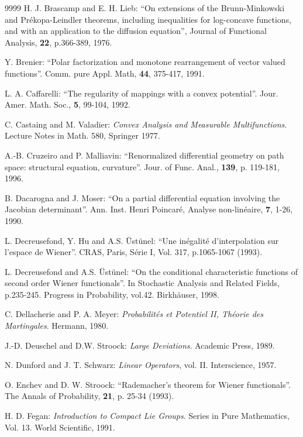 \documentclass[12pt,a4paper]{book}
\begin{document}
\begin{thebibliography}{9999}
H. J. Brascamp and E. H. Lieb:
``On extensions of the Brunn-Minkowski and Pr\'ekopa-Leindler theorems,
including inequalities for log-concave functions, and with an application to
the diffusion equation'', Journal of Functional Analysis, {\bf 22},
p.366-389, 1976.

Y. Brenier: 
``Polar factorization and monotone rearrangement of vector valued
functions''. Comm. pure Appl. Math, {\bf 44}, 375-417, 1991.

L. A. Caffarelli: ``The regularity of mappings with a convex
potential''. Jour. Amer. Math. Soc., {\bf 5}, 99-104, 1992.


C. Castaing and M. Valadier: {\sl Convex Analysis and
  Measurable Multifunctions}. Lecture Notes in Math. 580, Springer 1977.

 A.-B. Cruzeiro and P. Malliavin: ``Renormalized differential
  geometry on path space: structural equation, curvature''. Jour. of
  Func. Anal., {\bf 139}, p. 119-181, 1996.

B. Dacarogna and J. Moser:
``On a partial differential equation involving the Jacobian
determinant''. Ann. Inst. Henri Poincar\'e, Analyse non-lin\'eaire,
{\bf 7}, 1-26, 1990.


L. Decreusefond, Y. Hu and A.S. \"Ust\"unel: ``Une
  in\'egalit\'e d'interpolation sur l'espace de Wiener''. CRAS, Paris,
  S\'erie I, Vol. 317, p.1065-1067 (1993).

L. Decreusefond and A.S. \"Ust\"unel: ``On the
  conditional characteristic functions of second order Wiener
  functionals''. In Stochastic Analysis and Related Fields, p.235-245.
Progress in Probability, vol.42. Birkh\"auser, 1998.

C. Dellacherie and P. A. Meyer: {\sl Probabilit\'es et
    Potentiel II, Th\'eorie des Martingales}. Hermann, 1980.

J.-D. Deuschel and D.W. Stroock: {\sl  Large
  Deviations}. Academic Press, 1989.

N. Dunford and J. T. Schwarz: {\sl Linear Operators},
  vol. II. Interscience, 1957.

O. Enchev and D. W. Stroock: ``Rademacher's theorem for
  Wiener functionals''. The Annals of Probability, {\bf 21}, p. 25-34 (1993).

 H. D. Fegan: {\sl Introduction to Compact Lie
    Groups}. Series in Pure Mathematics, Vol. 13. World Scientific,
  1991.


\end{thebibliography}
\end{document}
